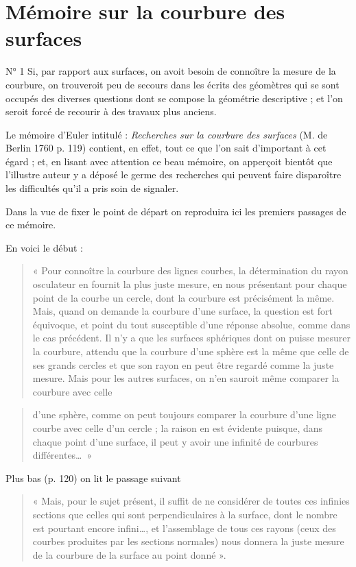 \documentclass[11pt,a4paper]{article}
\begin{document}
\section{Mémoire sur la courbure des surfaces}

N° 1 Si, par rapport aux surfaces, on avoit besoin de connoître la mesure de
la courbure, on trouveroit peu de secours dans les écrits des géomètres qui
se sont occupés des diverses questions dont se compose la géométrie
descriptive ; et l'on seroit forcé de recourir à des travaux plus anciens.

Le mémoire d'Euler intitulé : \emph{Recherches sur la courbure des surfaces}
(M. de Berlin 1760 p. 119) contient, en effet, tout ce que l'on sait
d'important à cet égard ; et, en lisant avec attention ce beau mémoire, on
apperçoit bientôt que l'illustre auteur y a déposé le germe des recherches
qui peuvent faire disparoître les difficultés qu'il a pris soin de signaler.

Dans la vue de fixer le point de départ on reproduira ici les premiers
passages de ce mémoire.

En voici le début :

\begin{quote}
« Pour connoître la courbure des lignes courbes, la détermination du rayon
osculateur en fournit la plus juste mesure, en nous présentant pour chaque
point de la courbe un cercle, dont la courbure est précisément la même. Mais,
quand on demande la courbure d'une surface, la question est fort équivoque,
et point du tout susceptible d'une réponse absolue, comme dans le cas
précédent. Il n'y a que les surfaces sphériques dont on puisse mesurer la
courbure, attendu que la courbure d'une sphère est la même que celle de ses
grands cercles et que son rayon en peut être regardé comme la juste mesure.
Mais pour les autres surfaces, on n'en sauroit même comparer la courbure avec
celle
\end{quote}

\begin{quote}
d'une sphère, comme on peut toujours comparer la courbure d'une ligne courbe
avec celle d'un cercle ; la raison en est évidente puisque, dans chaque point
d'une surface, il peut y avoir une infinité de courbures différentes\ldots\ »
\end{quote}

Plus bas (p. 120) on lit le passage suivant

\begin{quote}
« Mais, pour le sujet présent, il suffit de ne considérer de toutes ces
infinies sections que celles qui sont perpendiculaires à la surface, dont le
nombre est pourtant encore infini\ldots, et l'assemblage de tous ces rayons
(ceux des courbes produites par les sections normales) nous donnera la juste
mesure de la courbure de la surface au point donné ».
\end{quote}
\end{document}

